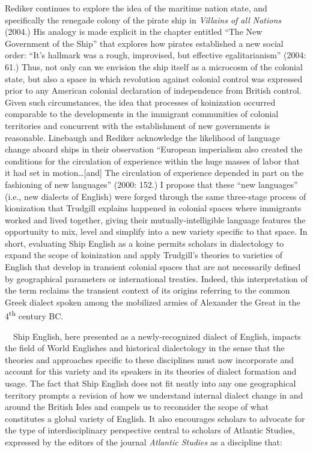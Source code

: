 \begin{styleStandard}
Rediker continues to explore the idea of the maritime nation state, and specifically the renegade colony of the pirate ship in \textit{Villains of all Nations} (2004.) His analogy is made explicit in the chapter entitled “The New Government of the Ship” that explores how pirates established a new social order: “It’s hallmark was a rough, improvised, but effective egalitarianism” (2004: 61.) Thus, not only can we envision the ship itself as a microcosm of the colonial state, but also a space in which revolution against colonial control was expressed prior to any American colonial declaration of independence from British control. Given such circumstances, the idea that processes of koinization occurred comparable to the developments in the immigrant communities of colonial territories and concurrent with the establishment of new governments is reasonable. Linebaugh and Rediker acknowledge the likelihood of language change aboard ships in their observation “European imperialism also created the conditions for the circulation of experience within the huge masses of labor that it had set in motion…[and] The circulation of experience depended in part on the fashioning of new languages” (2000: 152.) I propose that these “new languages” (i.e., new dialects of English) were forged through the same three-stage process of kionization that Trudgill explains happened in colonial spaces where immigrants worked and lived together, giving their mutually-intelligible language features the opportunity to mix, level and simplify into a new variety specific to that space. In short, evaluating Ship English as a koine permits scholars in dialectology to expand the scope of koinization and apply Trudgill’s theories to varieties of English that develop in transient colonial spaces that are not necessarily defined by geographical parameters or international treaties. Indeed, this interpretation of the term reclaims the transient context of its origins referring to the common Greek dialect spoken among the mobilized armies of Alexander the Great in the 4\textsuperscript{th} century BC. 
\end{styleStandard}

\begin{styleStandard}
\ \ Ship English, here presented as a newly-recognized dialect of English, impacts the field of World Englishes and historical dialectology in the sense that the theories and approaches specific to these disciplines must now incorporate and account for this variety and its speakers in its theories of dialect formation and usage. The fact that Ship English does not fit neatly into any one geographical territory prompts a revision of how we understand internal dialect change in and around the British Isles and compels us to reconsider the scope of what constitutes a global variety of English. It also encourages scholars to advocate for the type of interdisciplinary perspective central to scholars of Atlantic Studies, expressed by the editors of the journal \textit{Atlantic Studies} as a discipline that:
\end{styleStandard}


